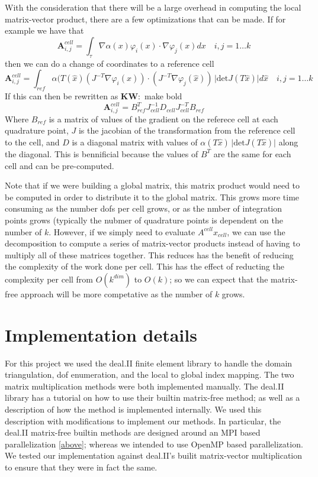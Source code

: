 \documentclass[12pt]{article}
\newcommand{\KW}[1]{{\color{blue}\textbf{KW}:~#1}}
\newcommand{\dofspercell}{k}
\begin{document}
With the consideration that there will be a large overhead in computing the local matrix-vector product, there are a few optimizations that can be made. If for example we have that 
$$\mathbf{A}^{cell}_{i,j} = \int_{\tau}\nabla \alpha(x) \varphi_{i}(x) \cdot \nabla \varphi_{j}(x) dx\quad i,j = 1 \ldots \dofspercell$$ 
then we can do a change of coordinates to a reference cell
$$\mathbf{A}^{cell}_{i,j} = \int_{ref} \alpha(T(\hat{x}) (J^{-T}\nabla \varphi_{i}(\hat{x})) \cdot (J^{-T}\nabla \varphi_{j}(\hat{x}))\,\vert \mathrm{det}J(T\hat{x}) \vert d\hat{x} \quad i,j = 1 \ldots \dofspercell$$ 
If this can then be rewritten as 
\KW{make bold}
$$\mathbf{A}^{cell}_{i,j} = B^{T}_{ref}J^{-1}_{cell}D_{cell}J^{-T}_{cell}B_{ref}$$
Where $B_{ref}$ is a matrix of values of the gradient on the referece cell at each quadrature point, $J$ is the jacobian of the transformation from the reference cell to the cell, and $D$ is a diagonal matrix with values of $\alpha(T\hat{x})\, \vert \mathrm{det}J(T\hat{x}) \vert$ along the diagonal. This is bennificial because the  values of $B^{T}$ are the same for each cell and can be pre-computed.

Note that if we were building a global matrix, this matrix product would need to be computed in order to distribute it to the global matrix. This grows more time consuming as the number dofs per cell grows, or as the nmber of integration points grows (typically the nubmer of quadrature points is dependent on the number of $\dofspercell$. However, if we simply need to evaluate $A^{cell}x_{cell}$, we can use the decomposition to compute a series of matrix-vector products instead of having to multiply all of these matrices together. This reduces has the benefit of reducing the complexity of the work done per cell. This has the effect of reducting the complexity per cell from $O(\dofspercell^{dim})$ to $O(\dofspercell)$; so we can expect that the matrix-free approach will be more competative as the number of $\dofspercell$ grows.


\section{Implementation details}

For this project we used the deal.II finite element library to handle the domain triangulation, dof enumeration, and the local to global index mapping. The two matrix multiplication methods were both implemented manually. The deal.II library has a tutorial on how to use their builtin matrix-free method; as well as a description of how the method is implemented internally. We used this description with modifications to implement our methods. In particular, the deal.II matrix-free builtin methods are designed around an MPI based parallelization \ref{above}; whereas we intended to use OpenMP based parallelization. We tested our implementation against deal.II's builit matrix-vector multiplication to ensure that they were in fact the same.
\end{document}
